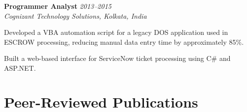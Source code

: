 \documentclass[10pt,letterpaper]{article}
\begin{document}
\begin{entrylist}
  \item \textbf{Programmer Analyst} \hfill \textit{2013--2015}\\
  \emph{Cognizant Technology Solutions, Kolkata, India}
  \begin{subitems}
    \item Developed a VBA automation script for a legacy DOS application used in ESCROW processing, reducing manual data entry time by approximately 85\%.
    \item Built a web-based interface for ServiceNow ticket processing using C\# and ASP.NET.
  \end{subitems}
\end{entrylist}

\section*{Peer-Reviewed Publications}
\end{document}
